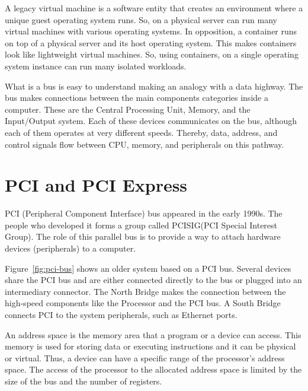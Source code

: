\documentclass[12pt, a4paper]{report}
\begin{document}
A legacy virtual machine is a software entity that creates an environment where a unique guest operating system runs. So, on a physical server can run many virtual machines with various operating systems. In opposition, a container runs on top of a physical server and its host operating system. This makes containers look like lightweight virtual machines. So, using containers, on a single operating system instance can run many isolated workloads.

What is a bus is easy to understand making an analogy with a data highway. The bus makes connections between the main components categories inside a computer. These are the Central Processing Unit, Memory, and the Input/Output system. Each of these devices communicates on the bus, although each of them operates at very different speeds. Thereby, data, address, and control signals flow between CPU, memory, and peripherals on this pathway.

\section{PCI and PCI Express}

PCI (Peripheral Component Interface) bus appeared in the early 1990s. The people who developed it forms a group called PCISIG\footnotemark (PCI Special Interest Group). The role of this parallel bus is to provide a way to attach hardware devices (peripherals) to a computer.

Figure~\ref{fig:pci-bus} shows an older system based on a PCI bus. Several devices share the PCI bus and are either connected directly to the bus or plugged into an intermediary connector. The North Bridge makes the connection between the high-speed components like the Processor and the PCI bus. A South Bridge connects PCI to the system peripherals, such as Ethernet ports.

An address space is the memory area that a program or a device can access. This memory is used for storing data or executing instructions and it can be physical or virtual. Thus, a device can have a specific range of the processor's address space. The access of the processor to the allocated address space is limited by the size of the bus and the number of registers.
\end{document}
